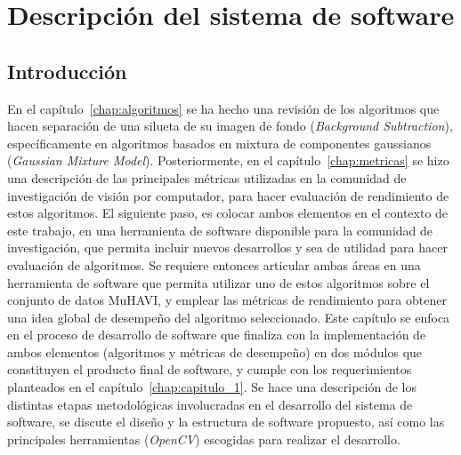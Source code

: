 \chapter{Descripción del sistema de software}\label{sistema_de_software}

\section{Introducción}

En el capítulo~\ref{chap:algoritmos} se ha hecho una revisión de los algoritmos que hacen separación de una silueta de su imagen de fondo (\textit{Background Subtraction}), específicamente en algoritmos basados en mixtura de componentes gaussianos (\textit{Gaussian Mixture Model}). Posteriormente, en el capítulo~\ref{chap:metricas} se hizo una descripción de las principales métricas utilizadas en la comunidad de investigación de visión por computador, para hacer evaluación de rendimiento de estos algoritmos. El siguiente paso, es colocar ambos elementos en el contexto de este trabajo, en una herramienta de software disponible para la comunidad de investigación, que permita incluir nuevos desarrollos y sea de utilidad para hacer evaluación de algoritmos. Se requiere entonces articular ambas áreas en una herramienta de software que permita utilizar uno de estos algoritmos sobre el conjunto de datos MuHAVI, y emplear las métricas de rendimiento para  obtener una idea global de desempeño del algoritmo seleccionado. Este capítulo se enfoca en el proceso de desarrollo de software que finaliza con la implementación de ambos elementos (algoritmos y métricas de desempeño) en dos módulos que constituyen el producto final de software, y cumple con los requerimientos planteados en el capítulo~\ref{chap:capitulo_1}. Se hace una descripción de los distintas etapas metodológicas involucradas en el desarrollo del sistema de software, se discute el diseño y la estructura de software propuesto, así como las principales herramientas (\textit{OpenCV}) escogidas para realizar el desarrollo.

